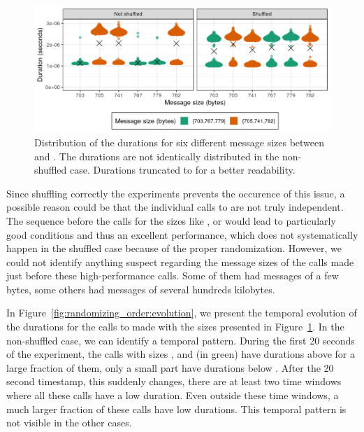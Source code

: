         \begin{figure}[htpb]
            \centering
            \includegraphics[width=0.8\linewidth]{img/experiment/randomizing_order/distribution.png}
            \caption{Distribution of the \recv durations for six different message sizes between  and
            .  The durations are not identically distributed in the non-shuffled case.  Durations
            truncated to  for a better readability.}%
            \label{fig:randomizing_order:distribution}
        \end{figure}

        Since shuffling correctly the experiments prevents the occurence of this issue, a possible reason could be that
        the individual calls to \recv are not truly independent. The sequence before the calls for the sizes like
        ,  or  would lead to particularly good conditions and thus an
        excellent performance, which does not systematically happen in the shuffled case because of the proper
        randomization. However, we could not identify anything suspect regarding the message sizes of the calls made
        just before these high-performance calls. Some of them had messages of a few bytes, some others had messages of
        several hundreds kilobytes.

        In Figure~\ref{fig:randomizing_order:evolution}, we present the temporal evolution of the durations for the
        calls to \recv made with the sizes presented in Figure~\ref{fig:randomizing_order:distribution}. In the
        non-shuffled case, we can identify a temporal pattern. During the first 20 seconds of the experiment, the
        calls with sizes ,  and  (in green) have durations above
         for a large fraction of them, only a small part have durations below
        . After the 20 second timestamp, this suddenly changes, there are at least two time
        windows where all these calls have a low duration. Even outside these time windows, a much larger fraction of
        these calls have low durations. This temporal pattern is not visible in the other cases.


